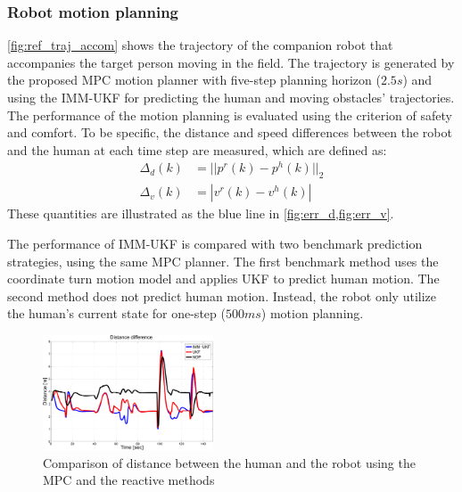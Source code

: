 \documentclass[letterpaper, 10 pt, conference]{ieeeconf}
\begin{document}
	\subsubsection{Robot motion planning}\label{subsubsec:motion_plan}
	\cref{fig:ref_traj_accom} shows the trajectory of the companion robot that accompanies the target person moving in the field. The trajectory is generated by the proposed MPC motion planner with five-step planning horizon ($2.5s$) and using the IMM-UKF for predicting the human and moving obstacles' trajectories.
	The performance of the motion planning is evaluated using the criterion of safety and comfort.
	To be specific, the distance and speed differences between the robot and the human at each time step are measured, which are defined as:
	\begin{subequations}
		\begin{align}
			\Delta_d(k)&=||p^r(k)-p^h(k)||_2\label{eqn:err_d}\\
			\Delta_v(k)&=|v^r(k)-v^h(k)|\label{eqn:err_v}
		\end{align}
	\end{subequations}
	These quantities are illustrated as the blue line in \cref{fig:err_d,fig:err_v}.
	
	The performance of IMM-UKF is compared with two benchmark prediction strategies, using the same MPC planner.
	The first benchmark method uses the coordinate turn motion model and applies UKF to predict human motion.
	The second method does not predict human motion.
	Instead, the robot only utilize the human's current state for one-step ($500ms$) motion planning.
	
	\begin{figure}
		\centering
		\includegraphics[width=0.45\textwidth]{figures/dis_diff2.pdf}
		\caption{Comparison of distance between the human and the robot using the MPC and the reactive methods}
		\label{fig:err_d}
	\end{figure}
	
\end{document}
